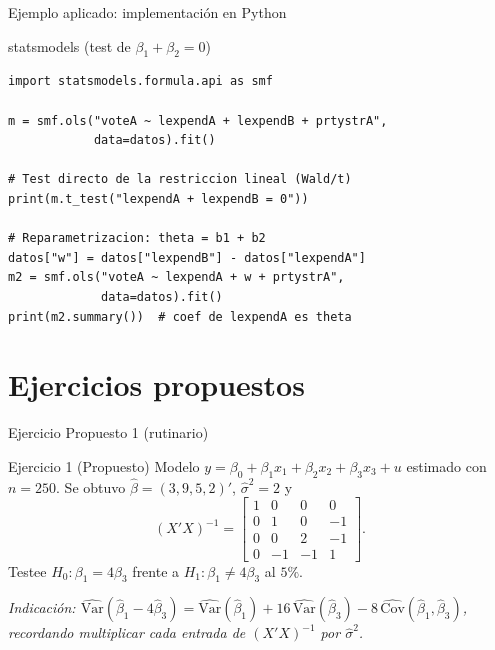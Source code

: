 \documentclass{beamer}
\begin{document}
\begin{frame}[fragile]{Ejemplo aplicado: implementación en Python}
\begin{exampleblock}{statsmodels (test de $\beta_1+\beta_2=0$)}
\begin{verbatim}
import statsmodels.formula.api as smf

m = smf.ols("voteA ~ lexpendA + lexpendB + prtystrA",
            data=datos).fit()

# Test directo de la restriccion lineal (Wald/t)
print(m.t_test("lexpendA + lexpendB = 0"))

# Reparametrizacion: theta = b1 + b2
datos["w"] = datos["lexpendB"] - datos["lexpendA"]
m2 = smf.ols("voteA ~ lexpendA + w + prtystrA",
             data=datos).fit()
print(m2.summary())  # coef de lexpendA es theta
\end{verbatim}
\end{exampleblock}
\end{frame}

\section{Ejercicios propuestos}

\begin{frame}{Ejercicio Propuesto 1 (rutinario)}
\begin{block}{Ejercicio 1 (Propuesto)}
Modelo $y=\beta_0+\beta_1 x_1+\beta_2 x_2+\beta_3 x_3+u$ estimado con $n=250$. Se obtuvo $\hat{\beta}=(3,9,5,2)'$, $\hat{\sigma}^2=2$ y
\[
(X'X)^{-1}=\begin{bmatrix}1&0&0&0\\0&1&0&-1\\0&0&2&-1\\0&-1&-1&1\end{bmatrix}.
\]
Testee $H_0:\beta_1=4\beta_3$ frente a $H_1:\beta_1\neq 4\beta_3$ al $5\%$.
\end{block}
{\small \textit{Indicación: $\hat{\text{Var}}(\hat{\beta}_1-4\hat{\beta}_3)=\hat{\text{Var}}(\hat{\beta}_1)+16\,\hat{\text{Var}}(\hat{\beta}_3)-8\,\hat{\text{Cov}}(\hat{\beta}_1,\hat{\beta}_3)$, recordando multiplicar cada entrada de $(X'X)^{-1}$ por $\hat{\sigma}^2$.}}
\end{frame}
\end{document}
